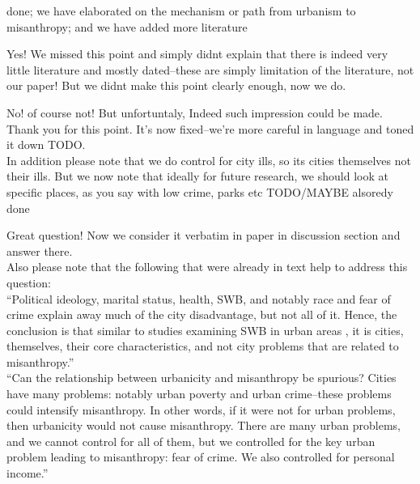 done; we have elaborated on the mechanism or path from urbanism to misanthropy;
and we have added more literature



Yes! We missed this point and simply didnt explain that there is indeed very
little literature and mostly dated--these are simply limitation of the
literature, not our paper! But we didnt make this point clearly enough, now we
do. 


No! of course not! But unfortuntaly, Indeed such impression could be made. Thank
you for this point. It's now fixed--we're more careful in language and toned it
down TODO.\\


In addition please note that we do control for city ills, so its cities
themselves not their ills. But we now note that ideally for future research, we
should look at specific places, as you say with low crime, parks etc TODO/MAYBE
alsoredy done  



Great question! Now we consider it verbatim in paper in discussion section and
answer there.\\

Also please note that the following that were already in text help to address
this question:\\

``Political ideology, marital status, health, SWB, and notably race and fear of crime explain away much of the city disadvantage, but not all of it. Hence, the
conclusion is that similar to studies examining SWB in urban areas \citep{aok_brfss_city_cize16}, it is cities, themselves, their core characteristics, and not city problems that are related to misanthropy.''\\

``Can the relationship between urbanicity and misanthropy be spurious? Cities have many problems: notably urban poverty and urban crime--these problems could intensify misanthropy. In other words, if it were not for urban problems, then urbanicity would not cause misanthropy. There are many urban problems, and we cannot control for all of them, but we controlled for the key urban problem leading to misanthropy: fear of crime. We also controlled for personal income.''



